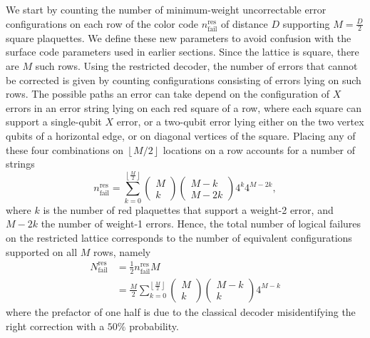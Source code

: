 \documentclass[a4paper,twocolumn,11pt,accepted=2024-12-23]{quantumarticle}
\begin{document}
We start by counting the number of minimum-weight uncorrectable error configurations on each row of the color code $n_{\textrm{fail}}^{\textrm{res}}$ of distance $D$ supporting $M=\frac{D}{2}$ square plaquettes. We define these new parameters to avoid confusion with the surface code parameters used in earlier sections. Since the lattice is square, there are $M$ such rows. Using the restricted decoder, the number of errors that cannot be corrected is given by counting configurations consisting of errors lying on such rows. The possible paths an error can take depend on the configuration of $X$ errors in an error string lying on each red square of a row, where each square can support a single-qubit $X$ error, or a two-qubit error lying either on the two vertex qubits of a horizontal edge, or on diagonal vertices of the square. Placing any of these four combinations on $\left \lfloor M/2 \right \rfloor$ locations on a row accounts for a number of strings 
\begin{equation}
n_{\textrm{fail}}^{\textrm{res}}=\sum_{k=0}^{\left \lfloor \frac{M}{2}\right \rfloor}\begin{pmatrix}
 M\\k
\end{pmatrix}\begin{pmatrix}
 M-k\\M-2k
\end{pmatrix} 4^{k}4^{M-2k},
\label{eq:color_restricted_expected_fail}
\end{equation}
where $k$ is the number of red plaquettes that support a weight-2 error, and $M-2k$ the number of weight-1 errors. Hence, the total number of logical failures on the restricted lattice corresponds to the number of equivalent configurations supported on all $M$ rows, namely
\begin{equation} 
\begin{split}
N_{\textrm{fail}}^{\textrm{res}} & = \frac{1}{2}n_{\textrm{fail}}^{\textrm{res}}M \\
 & = \frac{M}{2}\sum_{k=0}^{\left \lfloor \frac{M}{2}\right \rfloor}\begin{pmatrix}
 M\\k
\end{pmatrix}\begin{pmatrix}
 M-k\\k
\end{pmatrix} 4^{M-k}
\end{split} 
\label{eq:N_fail_color_restricted} 
\end{equation}
where the prefactor of one half is due to the classical decoder misidentifying the right correction with a $50\%$ probability. 
\end{document}
